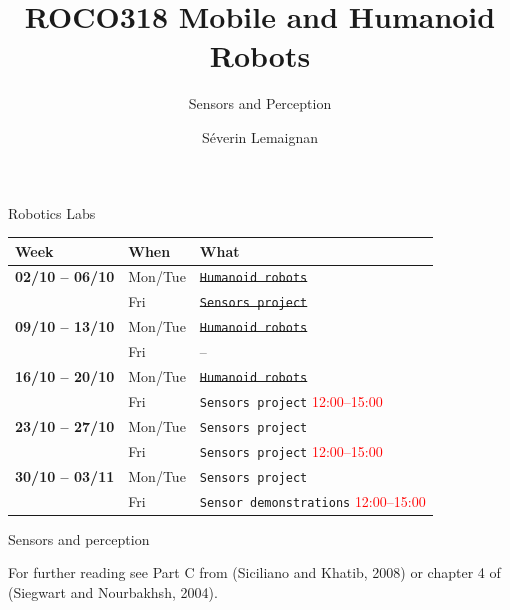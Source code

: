 \documentclass[compress]{beamer}
\title{ROCO318 \newline Mobile and Humanoid Robots}
\subtitle{Sensors and Perception}
\date{}
\author{Séverin Lemaignan}
\institute{Centre for Neural Systems and Robotics\\{\bf Plymouth University}}
\begin{document}

\maketitle

\begin{frame}{Robotics Labs}

    \begin{tabular}{@{}lll@{}}
        \toprule
        \bf Week           & \bf When      & \bf What \\ \midrule
        \bf 02/10 -- 06/10 & Mon/Tue    & \sout{\textcolor{hriSec1Dark}{\tt Humanoid robots}}           \\
                           & Fri    & \sout{\textcolor{hriSec3Comp}{\tt Sensors project}}           \\
        \bf 09/10 -- 13/10 & Mon/Tue    & \sout{\textcolor{hriSec1Dark}{\tt Humanoid robots}}           \\
                           & Fri    & --           \\
        \bf 16/10 -- 20/10 & Mon/Tue    & \sout{\textcolor{hriSec1Dark}{\tt Humanoid robots}}           \\
                           & Fri    & \textcolor{hriSec3Comp}{\tt Sensors project} \textcolor{red}{12:00--15:00}           \\
        \bf 23/10 -- 27/10 & Mon/Tue    & \textcolor{hriSec3Comp}{\tt Sensors project}           \\
                           & Fri    & \textcolor{hriSec3Comp}{\tt Sensors project} \textcolor{red}{12:00--15:00}           \\
        \bf 30/10 -- 03/11 & Mon/Tue    & \textcolor{hriSec3Comp}{\tt Sensors project}           \\
                           & Fri    & \textcolor{hriSec3Comp}{\tt Sensor demonstrations} \textcolor{red}{12:00--15:00}           \\
    \end{tabular}


\end{frame}


\begin{frame}{Sensors and perception}

    For further reading see Part C from (Siciliano and Khatib, 2008) or
    chapter 4 of (Siegwart and Nourbakhsh, 2004).

\end{frame}
\end{document}
